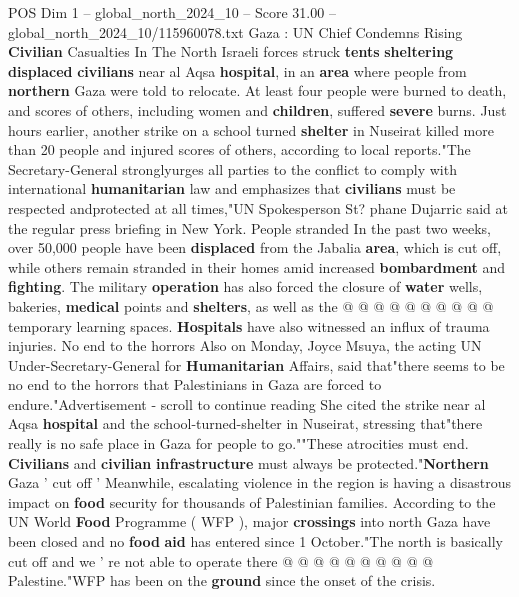 \begin{textsample}{POS Dim 1 – global\_north\_2024\_10 – Score 31.00 – global\_north\_2024\_10/115960078.txt}  \label{ex:f1_pos_379}
Gaza : UN Chief Condemns Rising \textbf{Civilian} Casualties In The North Israeli forces struck \textbf{tents} \textbf{sheltering} \textbf{displaced} \textbf{civilians} near al Aqsa \textbf{hospital}, in an \textbf{area} where people from \textbf{northern} Gaza were told to relocate.
At least four people were burned to death, and scores of others, including women and \textbf{children}, suffered \textbf{severe} burns.
Just hours earlier, another strike on a school turned \textbf{shelter} in Nuseirat killed more than 20 people and injured scores of others, according to local reports."The Secretary-General stronglyurges all parties to the conflict to comply with international \textbf{humanitarian} law and emphasizes that \textbf{civilians} must be respected andprotected at all times,"UN Spokesperson St? phane Dujarric said at the regular press briefing in New York.
People stranded In the past two weeks, over 50,000 people have been \textbf{displaced} from the Jabalia \textbf{area}, which is cut off, while others remain stranded in their homes amid increased \textbf{bombardment} and \textbf{fighting}.
The military \textbf{operation} has also forced the closure of \textbf{water} wells, bakeries, \textbf{medical} points and \textbf{shelters}, as well as the @ @ @ @ @ @ @ @ @ @ temporary learning spaces. \textbf{Hospitals} have also witnessed an influx of trauma injuries.
No end to the horrors Also on Monday, Joyce Msuya, the acting UN Under-Secretary-General for \textbf{Humanitarian} Affairs, said that"there seems to be no end to the horrors that Palestinians in Gaza are forced to endure."Advertisement - scroll to continue reading She cited the strike near al Aqsa \textbf{hospital} and the school-turned-shelter in Nuseirat, stressing that"there really is no safe place in Gaza for people to go.""These atrocities must end. \textbf{Civilians} and \textbf{civilian} \textbf{infrastructure} must always be protected."\textbf{Northern} Gaza ' cut off ' Meanwhile, escalating violence in the region is having a disastrous impact on \textbf{food} security for thousands of Palestinian families.
According to the UN World \textbf{Food} Programme ( WFP ), major \textbf{crossings} into north Gaza have been closed and no \textbf{food} \textbf{aid} has entered since 1 October."The north is basically cut off and we ' re not able to operate there @ @ @ @ @ @ @ @ @ @ Palestine."WFP has been on the \textbf{ground} since the onset of the crisis.

\end{textsample}
